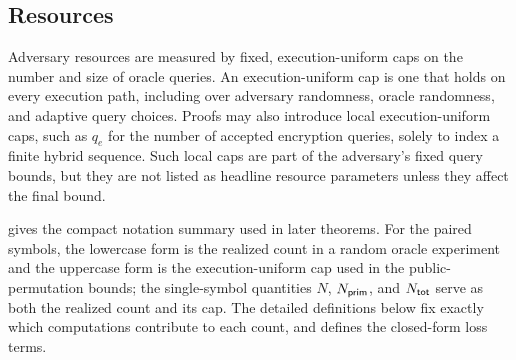 \subsection{Resources}
\label{sec:resources}

Adversary resources are measured by fixed, execution-uniform caps on
the number and size of oracle queries. An execution-uniform cap is one
that holds on every execution path, including over adversary
randomness, oracle randomness, and adaptive query choices.
Proofs may also introduce local execution-uniform caps, such as
$q_e$ for the number of accepted encryption queries, solely to index a
finite hybrid sequence. Such local caps are part of the adversary's
fixed query bounds, but they are not listed as headline resource parameters
unless they affect the final bound.

 gives the compact notation summary used in later
theorems. For the paired symbols, the lowercase form is the realized count in a
random oracle experiment and the uppercase form is the execution-uniform cap
used in the public-permutation bounds; the single-symbol quantities $N$,
$N_{\mathsf{prim}}$, and $N_{\mathsf{tot}}$ serve as both the realized count and its cap. The
detailed definitions below fix exactly which
computations contribute to each count, and  defines the
closed-form loss terms.

